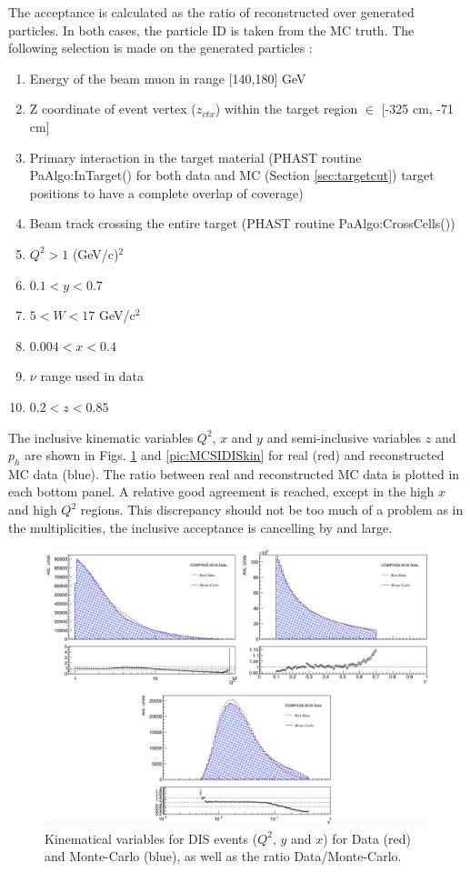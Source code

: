 The acceptance is calculated as the ratio of reconstructed over generated particles. In both cases, the particle ID is taken from the MC truth. The following selection is made on the generated particles :

\begin{enumerate}
  \item Energy of the beam muon in range [140,180] GeV
	\item Z coordinate of event vertex ($z_{vtx}$) within the target region $\in$ [-325 cm, -71 cm]
	\item Primary interaction in the target material (PHAST routine PaAlgo:InTarget() for both data and MC (Section \ref{sec:targetcut}) target positions to have a complete overlap of coverage)
	\item Beam track crossing the entire target (PHAST routine PaAlgo:CrossCells())
  \item $Q^2>1$ (GeV/c)$^2$
  \item $0.1 < y < 0.7$
	\item $5 < W < 17$ GeV/c$^2$
  \item $0.004 < x < 0.4$
  \item $\nu$ range used in data
  \item $0.2 < z < 0.85$
\end{enumerate}

The inclusive kinematic variables $Q^2$, $x$ and $y$ and semi-inclusive variables $z$ and $p_h$ are shown in Figs. \ref{pic:MCDISkin} and \ref{pic:MCSIDISkin} for real (red) and reconstructed MC data (blue). The ratio between real and reconstructed MC data is plotted in each bottom panel. A relative good agreement is reached, except in the high $x$ and high $Q^2$ regions. This discrepancy should not be too much of a problem as in the multiplicities, the inclusive acceptance is cancelling by and large.

\begin{figure}[!h]
	\includegraphics[scale=0.45]{./gfx/DIS_kin.png}
	\caption{Kinematical variables for DIS events ($Q^2$, $y$ and $x$) for Data (red) and Monte-Carlo (blue), as well as the ratio Data/Monte-Carlo.}
	\label{pic:MCDISkin}
\end{figure}

